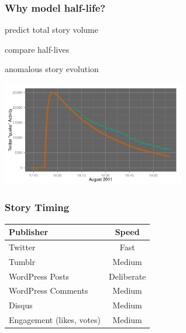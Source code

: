 \documentclass{beamer}
\begin{document}


\begin{frame}\frametitle{Why model half-life?}
\begin{center}
\begin{itemize}
\Huge{
\item predict total story volume
\item compare half-lives
\item anomalous story evolution
}
\end{itemize}
\end{center}
\end{frame}


\begin{frame}
  \begin{center}
    \includegraphics[width=8cm]{./imgs/va_quake_fit1.pdf}
  \end{center}
\end{frame}



\begin{frame} \frametitle{Story Timing}
\begin{table}
\begin{tabular}{l|c}
\hline
   {Publisher}   &   {Speed} \\
\hline 
    Twitter      &    Fast  \\ 
    Tumblr      &        Medium \\
    WordPress Posts &   Deliberate   \\
    WordPress Comments & Medium\\
    Disqus       &    Medium\\
    Engagement (likes, votes) &  Medium\\
\hline
\end{tabular}
\end{table}
\end{frame}
\end{document}
